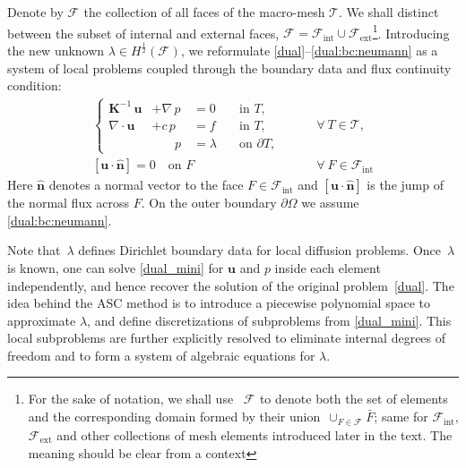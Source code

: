 \documentclass[12pt]{article}
\newcommand{\vect}[1]{\boldsymbol{\mathbf{#1}}}
\newcommand{\bcell}{T}
\newcommand{\bmesh}{{\vect{\mathcal T}}}
\newcommand{\bfaces}[1][]{{\vect{\mathcal F}_{\text{#1}}}}
\begin{document}
Denote by $\bfaces$ the collection of all faces of the macro-mesh $\bmesh$. We shall distinct between the subset of internal and external faces,  $\bfaces = \bfaces[int] \cup \bfaces[ext]$\footnote{For the sake of  notation, we shall use  ~$\bfaces$ to denote both the set of elements and the corresponding domain formed by their union~$\cup_{F\in \bfaces} \bar{F}$; same for $\bfaces[int]$, $\bfaces[ext]$ and other collections of mesh elements introduced later in the text. The meaning should be clear from a context}.
Introducing the new unknown $\lambda\in H^{\frac12}(\bfaces)$, we reformulate \eqref{dual}--\eqref{dual:bc:neumann} as a system of local problems coupled through the boundary data
and flux continuity condition:
 	\begin{eqnarray}\label{dual_mini}
\left\{
\begin{split}
			\vect K^{-1}\,\vect u &+ \nabla\,p\,    &= 0       &\quad\text{in } \bcell, \\
			\nabla\cdot\vect u    &+ c\,p           &= f       &\quad\text{in } \bcell, \\
			                      &\phantom{+cc\,}p &= \lambda &\quad\text{on } \partial\bcell, %
\end{split}
\right.&
\qquad \forall~\bcell\in\bmesh,\\
        \left[\vect u\cdot\hat{\vect n}\right]=0\quad\text{on } F& \qquad \forall~F\in\bfaces[int]  \label{flux_cond}
	\end{eqnarray}
Here $\hat{\vect n}$ denotes a normal vector to the face $F\in\bfaces[int]$ and $\left[\vect u\cdot\hat{\vect n}\right]$ is the jump of the normal flux across $F$. On the outer boundary $\partial\Omega$ we assume \eqref{dual:bc:neumann}.

Note that~$\lambda$ defines Dirichlet boundary data for local diffusion problems. Once~$\lambda$ is known, one can solve \eqref{dual_mini} for $\vect u$ and $p$ inside each element independently, and hence recover the solution of the original problem~\eqref{dual}. The idea behind the ASC method is to introduce a piecewise polynomial space to approximate $\lambda$, and  define discretizations of subproblems from \eqref{dual_mini}. This local subproblems are further explicitly resolved to eliminate internal degrees of freedom and to form a system of algebraic equations for $\lambda$.
\end{document}
